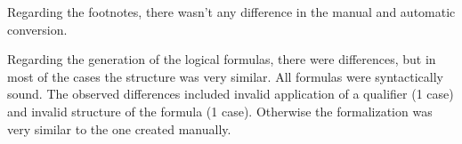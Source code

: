 Regarding the footnotes, there wasn't any difference in the manual and automatic conversion.

Regarding the generation of the logical formulas, there were differences, but in most of the cases the structure was very similar. All formulas were syntactically sound. The observed differences included invalid application of 
a qualifier (1 case) and invalid structure of the formula (1 case). Otherwise the formalization was very similar to the one created manually.






